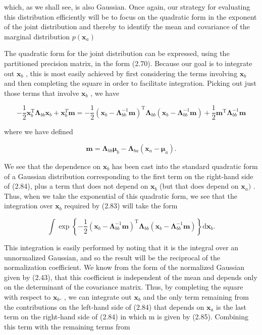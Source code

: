 \documentclass[
  10
]{article}
\begin{document}
which, as we shall see, is also Gaussian. Once again, our strategy for
evaluating this distribution efficiently will be to focus on the
quadratic form in the exponent of the joint distribution and thereby to
identify the mean and covariance of the marginal distribution
\(p ( \mathbf { x } _ { a } )\)

The quadratic form for the joint distribution can be expressed, using
the partitioned precision matrix, in the form (2.70). Because our goal
is to integrate out \(\mathbf { x } _ { b }\) , this is most easily
achieved by first considering the terms involving
\(\mathbf { x } _ { b }\) and then completing the square in order to
facilitate integration. Picking out just those terms that involve
\(\mathbf { x } _ { b }\) , we have

\[
- \frac {1}{2} \mathbf {x} _ {b} ^ {\mathrm{T}} \boldsymbol {\Lambda} _ {b b} \mathbf {x} _ {b} + \mathbf {x} _ {b} ^ {T} \mathbf {m} = - \frac {1}{2} (\mathbf {x} _ {b} - \boldsymbol {\Lambda} _ {b b} ^ {- 1} \mathbf {m}) ^ {\mathrm{T}} \boldsymbol {\Lambda} _ {b b} (\mathbf {x} _ {b} - \boldsymbol {\Lambda} _ {b b} ^ {- 1} \mathbf {m}) + \frac {1}{2} \mathbf {m} ^ {\mathrm{T}} \boldsymbol {\Lambda} _ {b b} ^ {- 1} \mathbf {m}\tag{2.84}
\]

where we have defined

\[
\mathbf {m} = \boldsymbol {\Lambda} _ {b b} \boldsymbol {\mu} _ {b} - \boldsymbol {\Lambda} _ {b a} (\mathbf {x} _ {a} - \boldsymbol {\mu} _ {a}).\tag{2.85}
\]

We see that the dependence on \(\mathbf { x } _ { b }\) has been cast
into the standard quadratic form of a Gaussian distribution
corresponding to the first term on the right-hand side of (2.84), plus a
term that does not depend on \(\mathbf { x } _ { b }\) (but that does
depend on \(\mathbf { x } _ { a } )\) . Thus, when we take the
exponential of this quadratic form, we see that the integration over
\(\mathbf { x } _ { b }\) required by (2.83) will take the form

\[
\int \exp \left\{- \frac {1}{2} (\mathbf {x} _ {b} - \boldsymbol {\Lambda} _ {b b} ^ {- 1} \mathbf {m}) ^ {\mathrm{T}} \boldsymbol {\Lambda} _ {b b} (\mathbf {x} _ {b} - \boldsymbol {\Lambda} _ {b b} ^ {- 1} \mathbf {m}) \right\} \mathrm{d} \mathbf {x} _ {b}.\tag{2.86}
\]

This integration is easily performed by noting that it is the integral
over an unnormalized Gaussian, and so the result will be the reciprocal
of the normalization coefficient. We know from the form of the
normalized Gaussian given by (2.43), that this coefficient is
independent of the mean and depends only on the determinant of the
covariance matrix. Thus, by completing the square with respect to
\(\mathbf { x } _ { b } .\) , we can integrate out
\(\mathbf { x } _ { b }\) and the only term remaining from the
contributions on the left-hand side of (2.84) that depends on
\(\mathbf { x } _ { a }\) is the last term on the right-hand side of
(2.84) in which m is given by (2.85). Combining this term with the
remaining terms from
\end{document}

